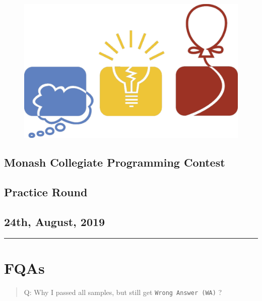 \documentclass[
]{article}
\date{}
\begin{document}
\begin{figure}
\centering
\includegraphics{icpc.jpg}
\end{figure}

\hypertarget{header-n33}{%
\begin{center}
\section{Monash Collegiate Programming Contest }\label{header-n33}
\end{center}
}

\hypertarget{header-n37}{%
\centering
\subsection{ \texorpdfstring{Practice Round}{Practice Round} }}

\hypertarget{header-n37}{%
\centering
\subsection{ \texorpdfstring{24th, August, 2019}{ 24th, August, 2019} }}

\begin{center}\rule{0.5\linewidth}{\linethickness}\end{center}

\newpage

\hypertarget{header-n43}{%
\section{FQAs}\label{header-n43}}

\begin{quote}
Q: Why I passed all samples, but still get \texttt{Wrong\ Answer\ (WA)} ?
\end{quote}
\end{document}
